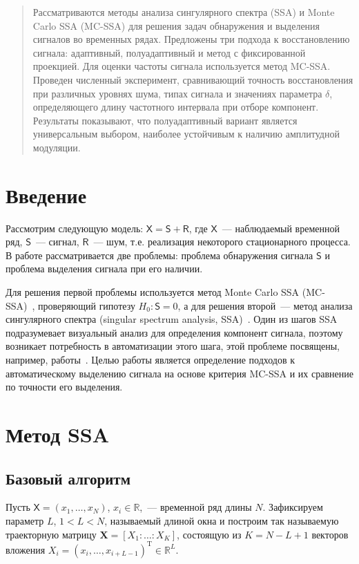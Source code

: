 \documentclass{math-mech-sci}
\begin{document}
\maketitle

\begin{abstract}
   Рассматриваются методы анализа сингулярного спектра (SSA) и Monte Carlo SSA (MC-SSA) для решения задач обнаружения и выделения сигналов во временных рядах. Предложены три подхода к восстановлению сигнала: адаптивный, полуадаптивный и метод с фиксированной проекцией. Для оценки частоты сигнала используется метод MC-SSA. Проведен численный эксперимент, сравнивающий точность восстановления при различных уровнях шума, типах сигнала и значениях параметра $\delta$, определяющего длину частотного интервала при отборе компонент. Результаты показывают, что полуадаптивный вариант является универсальным выбором, наиболее устойчивым к наличию амплитудной  модуляции.
\end{abstract}

\section*{Введение}
Рассмотрим следующую модель: $\mathsf{X}=\mathsf{S}+\mathsf{R}$, где $\mathsf{X}$~--- наблюдаемый временной ряд, $\mathsf{S}$~--- сигнал, $\mathsf{R}$~--- шум, т.е. реализация некоторого стационарного процесса. В работе рассматривается две проблемы: проблема обнаружения сигнала $\mathsf{S}$ и проблема выделения сигнала при его наличии.

Для решения первой проблемы используется метод Monte Carlo SSA (MC-SSA)~\cite{AllenSmith96}, проверяющий гипотезу $H_0:\mathsf{S}=0$, а для решения второй~--- метод анализа сингулярного спектра (singular spectrum analysis, SSA)~\cite{Broomhead1986, ssa2001}. Один из шагов SSA подразумевает визуальный анализ для определения компонент сигнала, поэтому возникает потребность в автоматизации этого шага, этой проблеме посвящены, например, работы~\cite{Kalantari2019, circSSA}. Целью работы является определение подходов к автоматическому выделению сигнала на основе критерия MC-SSA и их сравнение по точности его выделения.

\section*{Метод SSA}
\subsection*{Базовый алгоритм}
Пусть $\mathsf{X}=(x_1,\ldots,x_N)$, $x_i\in \mathbb{R}$,~--- временной ряд длины $N$. Зафиксируем параметр $L$, $1<L<N$, называемый длиной окна и построим так называемую траекторную матрицу $\mathbf{X}=[X_1:\ldots:X_K]$, состоящую из $K=N-L+1$ векторов вложения $X_i=(x_i,\ldots,x_{i+L-1})^{\mathrm{T}}\in \mathbb R^L$.
\end{document}
